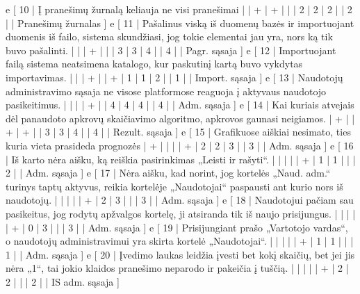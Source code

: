 {  e [ 10  | Į pranešimų žurnalą keliauja ne visi pranešimai
                    |   | + | + |   |   | 2 | 2 | 2 |   | 2 |      | Pranešimų žurnalas ]
  e [ 11  | Pašalinus viską iš duomenų bazės ir importuojant duomenis iš failo,
  sistema skundžiasi, jog tokie elementai jau yra, nors ką tik buvo pašalinti.
                    |   |   | + |   |   | 3 | 3 | 4 |   | 4 |      | Pagr. sąsaja ]
  e [ 12  | Importuojant failą sistema neatsimena katalogo, kur paskutinį
  kartą buvo vykdytas importavimas.
                    |   |   | + |   | + | 1 | 1 | 2 |   | 1 |      | Import. sąsaja ]
  e [ 13  | Naudotojų administravimo sąsaja ne visose platformose reaguoja į
  aktyvaus naudotojo pasikeitimus.
                    |   |   |   | + |   | 4 | 4 | 4 |   | 4 |      | Adm. sąsaja ]
  e [ 14  | Kai kuriais atvejais dėl panaudoto apkrovų skaičiavimo algoritmo,
  apkrovos gaunasi neigiamos.
                    | + |   | + | + |   | 3 | 3 | 4 |   | 4 |      | Rezult. sąsaja ]
  e [ 15 | Grafikuose aiškiai nesimato, ties kuria vieta prasideda prognozės
                    | + |   |   |   | + | 2 | 2 | 3 |   | 3 |      | Adm. sąsaja ]
  e [ 16 | Iš karto nėra aišku, ką reiškia pasirinkimas „Leisti ir rašyti“.
                    |   |   |   |   | + | 1 | 1 |   |   | 2 |      | Adm. sąsaja ]
  e [ 17 | Nėra aišku, kad norint, jog kortelės „Naud. adm.“ turinys taptų aktyvus,
  reikia kortelėje „Naudotojai“ paspausti ant kurio nors iš naudotojų.
                    |   |   |   |   | + | 2 | 3 |   |   | 3 |      | Adm. sąsaja ]
  e [ 18 | Naudotojui pačiam sau pasikeitus, jog rodytų apžvalgos kortelę, ji
  atsiranda tik iš naujo prisijungus.
                    |   |   |   |   | + | 0 | 3 |   |   | 3 |      | Adm. sąsaja ]
  e [ 19 | Prisijungiant prašo „Vartotojo vardas“, o naudotojų administravimui
  yra skirta kortelė „Naudotojai“.
                    |   |   |   |   | + | 1 | 1 |   |   | 1 |      | Adm. sąsaja ]
  e [ 20 | Įvedimo laukas leidžia įvesti bet kokį skaičių, bet jei jis nėra
  „1“, tai jokio klaidos pranešimo neparodo ir pakeičia į tuščią.
                    |   |   |   |   | + | 2 | 2 |   |   | 2 |      | IS adm. sąsaja ]
}
